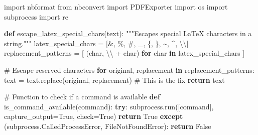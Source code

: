 \documentclass[
  11pt,
  letterpaper,
]{book}
\newenvironment{Shaded}{\begin{snugshade}}{\end{snugshade}}
\newcommand{\CharTok}[1]{\textcolor[rgb]{0.13,0.47,0.30}{#1}}
\newcommand{\CommentTok}[1]{\textcolor[rgb]{0.37,0.37,0.37}{#1}}
\newcommand{\ControlFlowTok}[1]{\textcolor[rgb]{0.00,0.23,0.31}{\textbf{#1}}}
\newcommand{\ImportTok}[1]{\textcolor[rgb]{0.00,0.46,0.62}{#1}}
\newcommand{\KeywordTok}[1]{\textcolor[rgb]{0.00,0.23,0.31}{\textbf{#1}}}
\newcommand{\NormalTok}[1]{\textcolor[rgb]{0.00,0.23,0.31}{#1}}
\newcommand{\OperatorTok}[1]{\textcolor[rgb]{0.37,0.37,0.37}{#1}}
\newcommand{\PreprocessorTok}[1]{\textcolor[rgb]{0.68,0.00,0.00}{#1}}
\newcommand{\StringTok}[1]{\textcolor[rgb]{0.13,0.47,0.30}{#1}}
\newcommand{\VariableTok}[1]{\textcolor[rgb]{0.07,0.07,0.07}{#1}}
\begin{document}
\begin{Shaded}
\begin{Highlighting}[]
\ImportTok{import}\NormalTok{ nbformat}
\ImportTok{from}\NormalTok{ nbconvert }\ImportTok{import}\NormalTok{ PDFExporter}
\ImportTok{import}\NormalTok{ os}
\ImportTok{import}\NormalTok{ subprocess}
\ImportTok{import}\NormalTok{ re}

\KeywordTok{def}\NormalTok{ escape\_latex\_special\_chars(text):}
  \CommentTok{"""Escapes special LaTeX characters in a string."""}
\NormalTok{  latex\_special\_chars }\OperatorTok{=}\NormalTok{ [}\StringTok{\textquotesingle{}\&\textquotesingle{}}\NormalTok{, }\StringTok{\textquotesingle{}\%\textquotesingle{}}\NormalTok{, }\StringTok{\textquotesingle{}\#\textquotesingle{}}\NormalTok{, }\StringTok{\textquotesingle{}\_\textquotesingle{}}\NormalTok{, }\StringTok{\textquotesingle{}\{\textquotesingle{}}\NormalTok{, }\StringTok{\textquotesingle{}\}\textquotesingle{}}\NormalTok{, }\StringTok{\textquotesingle{}\textasciitilde{}\textquotesingle{}}\NormalTok{, }\StringTok{\textquotesingle{}\^{}\textquotesingle{}}\NormalTok{, }\StringTok{\textquotesingle{}}\CharTok{\textbackslash{}\textbackslash{}}\StringTok{\textquotesingle{}}\NormalTok{]}
\NormalTok{  replacement\_patterns }\OperatorTok{=}\NormalTok{ [}
\NormalTok{      (char, }\StringTok{\textquotesingle{}}\CharTok{\textbackslash{}\textbackslash{}}\StringTok{\textquotesingle{}} \OperatorTok{+}\NormalTok{ char) }\ControlFlowTok{for}\NormalTok{ char }\KeywordTok{in}\NormalTok{ latex\_special\_chars}
\NormalTok{  ]}

  \CommentTok{\# Escape reserved characters}
  \ControlFlowTok{for}\NormalTok{ original, replacement }\KeywordTok{in}\NormalTok{ replacement\_patterns:}
\NormalTok{    text }\OperatorTok{=}\NormalTok{ text.replace(original, replacement) }\CommentTok{\# This is the fix}
  \ControlFlowTok{return}\NormalTok{ text}

\CommentTok{\# Function to check if a command is available}
\KeywordTok{def}\NormalTok{ is\_command\_available(command):}
    \ControlFlowTok{try}\NormalTok{:}
\NormalTok{        subprocess.run([command], capture\_output}\OperatorTok{=}\VariableTok{True}\NormalTok{, check}\OperatorTok{=}\VariableTok{True}\NormalTok{)}
        \ControlFlowTok{return} \VariableTok{True}
    \ControlFlowTok{except}\NormalTok{ (subprocess.CalledProcessError, }\PreprocessorTok{FileNotFoundError}\NormalTok{):}
        \ControlFlowTok{return} \VariableTok{False}


\end{Highlighting}
\end{Shaded}
\end{document}
